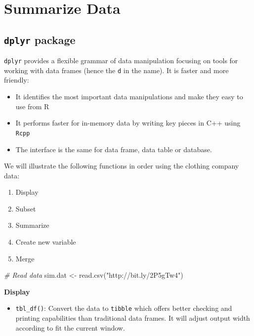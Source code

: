 \documentclass[
  12pt,
]{krantz}
\makeatletter
\newenvironment{Shaded}{\begin{snugshade}}{\end{snugshade}}
\newcommand{\CommentTok}[1]{\textcolor[rgb]{0.37,0.37,0.37}{\textit{#1}}}
\newcommand{\FunctionTok}[1]{\textcolor[rgb]{0,0,0}{#1}}
\newcommand{\NormalTok}[1]{#1}
\newcommand{\OtherTok}[1]{\textcolor[rgb]{0.37,0.37,0.37}{#1}}
\newcommand{\StringTok}[1]{\textcolor[rgb]{0.5,0.5,0.5}{#1}}
\providecommand{\tightlist}{%
  \setlength{\itemsep}{0pt}\setlength{\parskip}{0pt}}
\newenvironment{kframe}{%
\medskip{}
\setlength{\fboxsep}{.8em}
 \def\at@end@of@kframe{}%
 \ifinner\ifhmode%
  \def\at@end@of@kframe{\end{minipage}}%
  \begin{minipage}{\columnwidth}%
 \fi\fi%
 \def\FrameCommand##1{\hskip\@totalleftmargin \hskip-\fboxsep
 \colorbox{shadecolor}{##1}\hskip-\fboxsep
     \hskip-\linewidth \hskip-\@totalleftmargin \hskip\columnwidth}%
 \MakeFramed {\advance\hsize-\width
   \@totalleftmargin\z@ \linewidth\hsize
   \@setminipage}}%
 {\par\unskip\endMakeFramed%
 \at@end@of@kframe}
\renewenvironment{Shaded}{\begin{kframe}}{\end{kframe}}
\makeatother
\begin{document}
\hypertarget{summarize-data}{%
\section{Summarize Data}\label{summarize-data}}

\hypertarget{dplyr-package}{%
\subsection{\texorpdfstring{\texttt{dplyr} package}{dplyr package}}\label{dplyr-package}}

\texttt{dplyr} provides a flexible grammar of data manipulation focusing on tools for working with data frames (hence the \texttt{d} in the name). It is faster and more friendly:

\begin{itemize}
\tightlist
\item
  It identifies the most important data manipulations and make they easy to use from R
\item
  It performs faster for in-memory data by writing key pieces in C++ using \texttt{Rcpp}
\item
  The interface is the same for data frame, data table or database.
\end{itemize}

We will illustrate the following functions in order using the clothing company data:

\begin{enumerate}
\def\labelenumi{\arabic{enumi}.}
\tightlist
\item
  Display
\item
  Subset
\item
  Summarize
\item
  Create new variable
\item
  Merge
\end{enumerate}

\begin{Shaded}
\begin{Highlighting}[]
\CommentTok{\# Read data}
\NormalTok{sim.dat }\OtherTok{\textless{}{-}} \FunctionTok{read.csv}\NormalTok{(}\StringTok{"http://bit.ly/2P5gTw4"}\NormalTok{)}
\end{Highlighting}
\end{Shaded}

\textbf{Display}

\begin{itemize}
\tightlist
\item
  \texttt{tbl\_df()}: Convert the data to \texttt{tibble} which offers better checking and printing capabilities than traditional data frames. It will adjust output width according to fit the current window.
\end{itemize}
\end{document}
